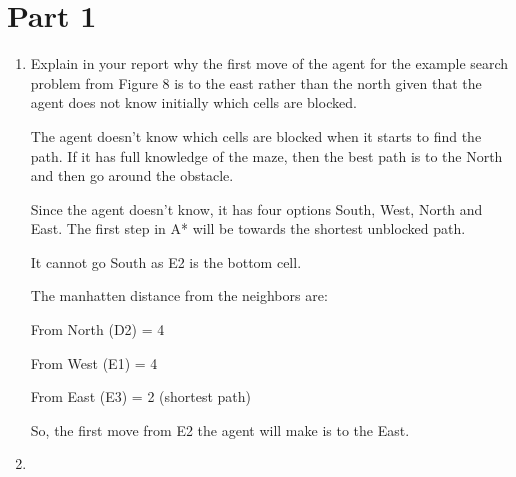 \documentclass[12pt]{article}
\begin{document}
\section*{Part 1}
\begin{enumerate}[label=\alph*]
  \item
     \begin{flushleft}
        \begin{itshape}
       
        Explain in your report why the first move of the agent for the example search problem from Figure 8  is to the east rather than the north given that the agent does not know initially which cells are blocked.
       
        \end{itshape}
        
The agent doesn’t know which cells are blocked when it starts to find the path. If it has full knowledge of the maze, then the best path is to the North and then go around 
the obstacle. 

	Since the agent doesn’t know, it has four options South, West, North and East. The first
step in A* will be towards the shortest unblocked path.

	It cannot go South as E2 is the bottom cell.
	
	The manhatten distance from the neighbors are:
	
	From North (D2) = 4
	
	From West (E1) = 4
	
	From East (E3) = 2 (shortest path)
	
	So, the first move from E2 the agent will make is to the East.

     \end{flushleft}
  \item
  	\begin{flushleft}
  	\begin{itshape}
       

\end{itshape}
\end{flushleft}
\end{enumerate}
\end{document}
